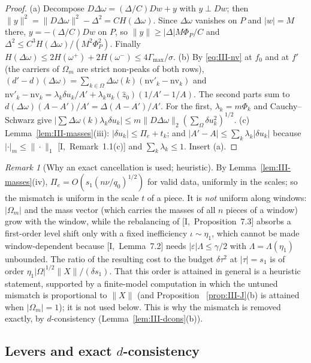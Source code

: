 \documentclass[10pt]{amsart}
\theoremstyle{definition}
\theoremstyle{remark}
\newtheorem{remark}[theorem]{Remark}
\newcommand{\zh}{\hat z}
\begin{document}
\begin{proof}
(a) Decompose $D\Delta\omega=(\Delta/C)Dw+y$ with $y\perp Dw$; then
$\|y\|^2=\|D\Delta\omega\|^2-\Delta^2=CH(\Delta\omega)$.  Since $\Delta\omega$
vanishes on $P$ and $|w|=M$ there, $y=-(\Delta/C)Dw$ on $P$, so $\|y\|\ge
|\Delta|M\Phi_P/C$ and $\Delta^2\le C^3H(\Delta\omega)/(M^2\Phi_P^2)$.  Finally
$H(\Delta\omega)\le2H(\omega^+)+2H(\omega^-)\le4\Gamma_{\max}/\sigma$.
(b) By \eqref{eq:III-nv} at $f_0$ and at $f'$ (the carriers of $\Omega_m$ are
strict non-peaks of both rows), $(d'-d)(\Delta\omega)=\sum_{k\in\Omega}
\Delta\omega(k)(\mathrm{nv}'_k-\mathrm{nv}_k)$ and $\mathrm{nv}'_k-\mathrm{nv}_k=
\lambda_k\delta u_k/A'+\lambda_ku_k(\zh_0)(1/A'-1/A)$.  The second parts sum to
$d(\Delta\omega)(A-A')/A'=\Delta(A-A')/A'$.  For the first, $\lambda_k=m\Phi_k$
and Cauchy--Schwarz give $|\sum\Delta\omega(k)\lambda_k\delta u_k|\le
m\|D\Delta\omega\|_2(\sum_{\Omega}\delta u_k^2)^{1/2}$.
(c) Lemma~\ref{lem:III-masses}(iii): $|\delta u_k|\le\Pi_e+t_k$; and
$|A'-A|\le\sum_k\lambda_k|\delta u_k|$ because $|\cdot|_m\le\|\cdot\|_1$
[I,~Remark~1.1(c)] and $\sum_k\lambda_k\le1$.  Insert (a).
\end{proof}

\begin{remark}[Why an exact cancellation is used; heuristic]\label{rem:III-J}
By Lemma~\ref{lem:III-masses}(iv), $\Pi_e=O(s_1(n\nu/q_0)^{1/2})$ for valid
data, uniformly in the scales; so the mismatch is uniform in the scale $t$ of a
piece.  It is \emph{not} uniform along windows: $|\Omega_m|$ and the mass
vector (which carries the masses of all $n$ pieces of a window) grow with the
window, while the rebalancing of [I,~Proposition~7.3] absorbs a first-order
level shift only with a fixed inefficiency $\iota\sim\eta_1$, which cannot be
made window-dependent because [I,~Lemma~7.2] needs $|\varepsilon|\Lambda\le
\gamma/2$ with $\Lambda=\Lambda(\eta_1)$ unbounded.  The ratio of the resulting
cost to the budget $\delta\tau^2$ at $|\tau|=s_1$ is of order
$\eta_1|\Omega|^{1/2}\|X\|/(\delta s_1)$.  That this order is attained in
general is a heuristic statement, supported by a finite-model computation in
which the untuned mismatch is proportional to $\|X\|$ (and Proposition~
\ref{prop:III-J}(b) is attained when $|\Omega_m|=1$); it is not used below.
This is why the mismatch is removed exactly, by $d$-consistency
(Lemma~\ref{lem:III-dcons}(b)).
\end{remark}

\subsection{Levers and exact $d$-consistency}\label{subsec:III-DC}
\end{document}
